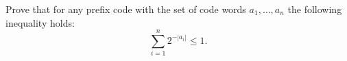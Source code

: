 Prove that for any prefix code with the set of code words $a_1, \dots, a_n$ the following inequality
holds:
$$
    \sum\limits_{i = 1}^{n} 2^{-|a_i|} \le 1.
$$
